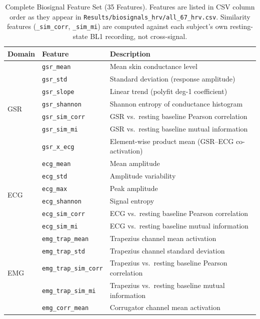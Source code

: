 \documentclass[10pt, twocolumn]{article}
\begin{document}
\begin{table}[tbp]
\centering
\caption{Complete Biosignal Feature Set (35 Features). Features are listed in
CSV column order as they appear in \texttt{Results/biosignals\_hrv/all\_67\_hrv.csv}.
Similarity features (\texttt{\_sim\_corr}, \texttt{\_sim\_mi}) are computed against
each subject's own resting-state BL1 recording, not cross-signal.}
\label{tab:features}
\small
\begin{tabular}{llp{7.8cm}}
\toprule
\textbf{Domain} & \textbf{Feature} & \textbf{Description} \\
\midrule
\multirow{7}{*}{GSR}
  & \texttt{gsr\_mean}       & Mean skin conductance level \\
  & \texttt{gsr\_std}        & Standard deviation (response amplitude) \\
  & \texttt{gsr\_slope}      & Linear trend (polyfit deg-1 coefficient) \\
  & \texttt{gsr\_shannon}    & Shannon entropy of conductance histogram \\
  & \texttt{gsr\_sim\_corr}  & GSR vs.\ resting baseline Pearson correlation \\
  & \texttt{gsr\_sim\_mi}    & GSR vs.\ resting baseline mutual information \\
  & \texttt{gsr\_x\_ecg}     & Element-wise product mean (GSR--ECG co-activation) \\
\midrule
\multirow{6}{*}{ECG}
  & \texttt{ecg\_mean}       & Mean amplitude \\
  & \texttt{ecg\_std}        & Amplitude variability \\
  & \texttt{ecg\_max}        & Peak amplitude \\
  & \texttt{ecg\_shannon}    & Signal entropy \\
  & \texttt{ecg\_sim\_corr}  & ECG vs.\ resting baseline Pearson correlation \\
  & \texttt{ecg\_sim\_mi}    & ECG vs.\ resting baseline mutual information \\
\midrule
\multirow{16}{*}{EMG}
  & \texttt{emg\_trap\_mean}       & Trapezius channel mean activation \\
  & \texttt{emg\_trap\_std}        & Trapezius channel standard deviation \\
  & \texttt{emg\_trap\_sim\_corr}  & Trapezius vs.\ resting baseline Pearson correlation \\
  & \texttt{emg\_trap\_sim\_mi}    & Trapezius vs.\ resting baseline mutual information \\
  & \texttt{emg\_corr\_mean}       & Corrugator channel mean activation \\

\end{tabular}
\end{table}
\end{document}
